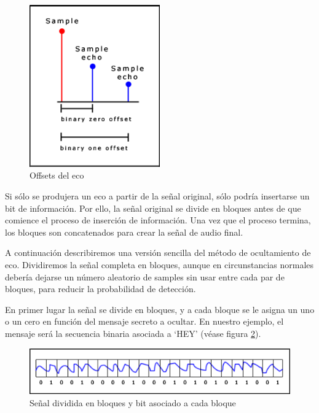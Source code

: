 \documentclass[12pt]{article}
\begin{document}
\begin{figure}
  \centering
    \includegraphics[width=0.5\textwidth]{img/echooffsets}
  \caption{Offsets del eco}
  \label{echooffsets}
\end{figure}

Si sólo se produjera un eco a partir de la señal original, sólo podría insertarse un bit de información. Por ello, la señal original se divide en bloques antes de que comience el proceso de inserción de información. Una vez que el proceso termina, los bloques son concatenados para crear la señal de audio final.

A continuación describiremos una versión sencilla del método de ocultamiento de eco. Dividiremos la señal completa en bloques, aunque en circunstancias normales debería dejarse un número aleatorio de samples sin usar entre cada par de bloques, para reducir la probabilidad de detección.

En primer lugar la señal se divide en bloques, y a cada bloque se le asigna un uno o un cero en función del mensaje secreto a ocultar. En nuestro ejemplo, el mensaje será la secuencia binaria asociada a `HEY' (véase figura \ref{echodividesignal}).

\begin{figure}
  \centering
    \includegraphics[width=\textwidth]{img/echodividesignal}
  \caption{Señal dividida en bloques y bit asociado a cada bloque}
  \label{echodividesignal}
\end{figure}
\end{document}
